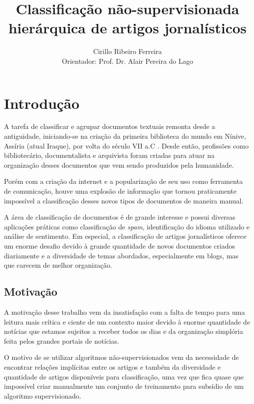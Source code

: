 \documentclass[a4paper,12pt]{article}
\title{Classificação não-supervisionada hierárquica de artigos jornalísticos}
\author{Cirillo Ribeiro Ferreira \\ Orientador: Prof. Dr. Alair Pereira do Lago}
\begin{document}
\maketitle
\newpage

\tableofcontents
\newpage
\section {Introdução}
A tarefa de classificar e agrupar documentos textuais remonta desde a antiguidade, iniciando-se na criação da primeira biblioteca do mundo em Nínive, Assíria (atual Iraque), por volta do século VII a.C \cite{redarterj}. Desde então, profissões como bibliotecário, documentalista e arquivista foram criadas para atuar na organização desses documentos que vem sendo produzidos pela humanidade.

Porém com a criação da internet e a popularização de seu uso como ferramenta de comunicação, houve uma explosão de informação que tornou praticamente impossível a classificação desses novos tipos de documentos de maneira manual.

A área de classificação de documentos é de grande interesse e possui diversas aplicações práticas como classificação de \textit{spam}, identificação do idioma utilizado e análise de sentimento. Em especial, a classificação de artigos jornalísticos oferece um enorme desafio devido à grande quantidade de novos documentos criados diariamente e a diversidade de temas abordados, especialmente em blogs, mas que carecem de melhor organização.

\subsection{Motivação}
\label{sec:motivacao}

A motivação desse trabalho vem da insatisfação com a falta de tempo para uma leitura mais crítica e ciente de um contexto maior devido à enorme quantidade de notícias que estamos sujeitos a receber todos os dias e da organização simplória feita pelos grandes portais de notícias.

O motivo de se utilizar algoritmos não-supervisionados vem da necessidade de encontrar relações implícitas entre os artigos e também da diversidade e quantidade de artigos disponíveis para classificação, uma vez que fica quase que impossível criar manualmente um conjunto de treinamento para subsídio de um algoritmo supervisionado.
\end{document}
